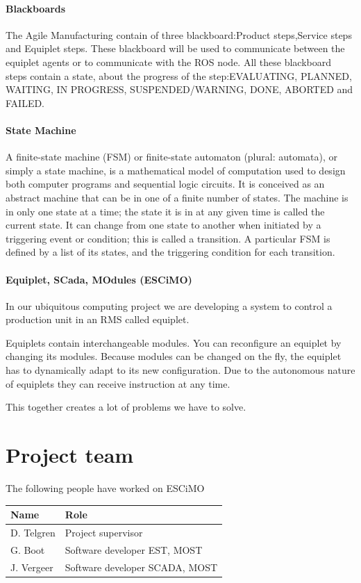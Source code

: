 \documentclass[12pt,a4paper]{report}
\begin{document}
\subsubsection{Blackboards}
The Agile Manufacturing contain of three blackboard:Product steps,Service steps and Equiplet steps. These blackboard will be used to communicate between the equiplet agents or to communicate with the ROS node. All these blackboard steps contain a state, about the progress of the step:EVALUATING, PLANNED, WAITING, IN PROGRESS, SUSPENDED/WARNING, DONE, ABORTED and FAILED.

\subsubsection{State Machine}
A finite-state machine (FSM) or finite-state automaton (plural: automata), or simply a state machine, is a mathematical model of computation used to design both computer programs and sequential logic circuits. It is conceived as an abstract machine that can be in one of a finite number of states. The machine is in only one state at a time; the state it is in at any given time is called the current state. It can change from one state to another when initiated by a triggering event or condition; this is called a transition. A particular FSM is defined by a list of its states, and the triggering condition for each transition.\cite{state_machine}

\subsubsection{Equiplet, SCada, MOdules (ESCiMO)}
In our ubiquitous computing project we are developing a system to control a production unit in an RMS called equiplet. 

Equiplets contain interchangeable modules. 
You can reconfigure an equiplet by changing its modules.
Because modules can be changed on the fly, the equiplet has to dynamically adapt to its new configuration.
Due to the autonomous nature of equiplets they can receive instruction at any time.

This together creates a lot of problems we have to solve.


\chapter{Project team}
The following people have worked on ESCiMO

\begin{tabular}{l | l}
Name       & Role \\
\hline
D. Telgren & Project supervisor \\
G. Boot    & Software developer EST, MOST \\
J. Vergeer & Software developer SCADA, MOST
\end{tabular}
\end{document}
